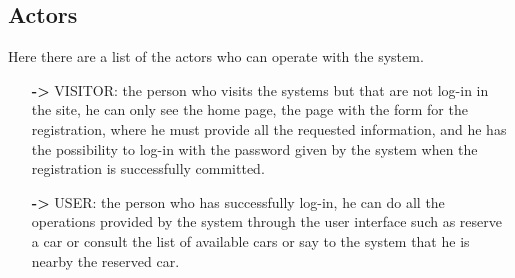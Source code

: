 \subsection{Actors} \label{subsec:actors}
Here there are a list of the actors who can operate with the system.
\begin{itemize}
\item[\textbf{->}] VISITOR: the person who visits the systems but that are not log-in in the site, he can only see the home page, the page with the form for the registration, where he must provide all the requested information, and he has the possibility to log-in with the password given by the system when the registration is successfully committed. 
\item[\textbf{->}] USER: the person who has successfully log-in, he can do all the operations provided by the system through the user interface such as reserve a car or consult the list of available cars or say to the system that he is nearby the reserved car. 
\end{itemize}

